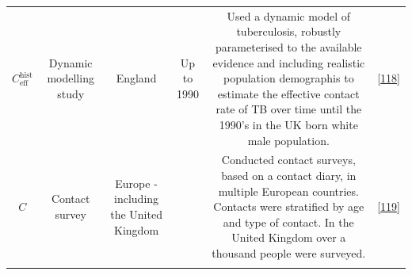 \documentclass[11pt,twoside]{bristolthesis}
\begin{document}
\begin{longtable}[]{@{}cccccc@{}}
\begin{minipage}[t]{0.19\columnwidth}
  \(C^{\text{hist}}_{\text{eff}}\)\strut
  \end{minipage} & \begin{minipage}[t]{0.09\columnwidth}\centering
  Dynamic
  modelling
  study\strut
  \end{minipage} & \begin{minipage}[t]{0.07\columnwidth}\centering
  England\strut
  \end{minipage} & \begin{minipage}[t]{0.07\columnwidth}\centering
  Up to
  1990\strut
  \end{minipage} & \begin{minipage}[t]{0.31\columnwidth}\centering
  Used a dynamic model of tuberculosis, robustly
  parameterised to the available evidence and
  including realistic population demographis to
  estimate the effective contact rate of TB over
  time until the 1990's in the UK born white male
  population.\strut
  \end{minipage} & \begin{minipage}[t]{0.10\columnwidth}\centering
  {[}\protect\hyperlink{ref-Vynnycky1999}{118}{]}\strut
  \end{minipage}\tabularnewline
  \begin{minipage}[t]{0.19\columnwidth}\centering
  \(C\)\strut
  \end{minipage} & \begin{minipage}[t]{0.09\columnwidth}\centering
  Contact
  survey\strut
  \end{minipage} & \begin{minipage}[t]{0.07\columnwidth}\centering
  Europe -
  including
  the
  United
  Kingdom\strut
  \end{minipage} & \begin{minipage}[t]{0.07\columnwidth}\centering
  2005\strut
  \end{minipage} & \begin{minipage}[t]{0.31\columnwidth}\centering
  Conducted contact surveys, based on a contact
  diary, in multiple European countries. Contacts
  were stratified by age and type of contact. In the
  United Kingdom over a thousand people were
  surveyed.\strut
  \end{minipage} & \begin{minipage}[t]{0.10\columnwidth}\centering
  {[}\protect\hyperlink{ref-Mossong2008}{119}{]}\strut
  \end{minipage}\tabularnewline
  \begin{minipage}[t]{0.19\columnwidth}\centering

\end{minipage}
\end{longtable}
\end{document}
